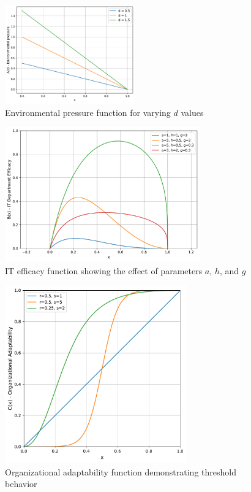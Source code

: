 \documentclass[a4paper, 10pt]{article}
\begin{document}
\begin{figure}[h]
	\centering
	\includegraphics[width=0.5\textwidth]{../images/params/A(x).pdf}
	\caption{Environmental pressure function for varying $d$ values}
\end{figure}

\begin{figure}[h]
	\centering
	\includegraphics[width=0.75\textwidth]{../images/params/B(x).pdf}
	\caption{IT efficacy function showing the effect of parameters $a$, $h$, and $g$}
\end{figure}

\begin{figure}[h]
	\centering
	\includegraphics[width=0.70\textwidth]{../images/params/C(x).pdf}
	\caption{Organizational adaptability function demonstrating threshold behavior}
\end{figure}
\end{document}
